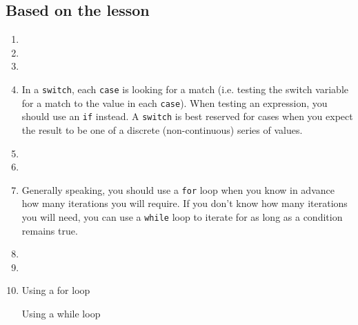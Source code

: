 \documentclass{article}
\begin{document}
	\subsection*{Based on the lesson}
	\begin{enumerate}
		\item 
		
		\item 
		
		\item 
		
		\item In a \texttt{switch}, each \texttt{case} is looking for a match (i.e. testing the switch variable for a match to the value in each \texttt{case}). When testing an expression, you should use an \texttt{if} instead. A \texttt{switch} is best reserved for cases when you expect the result to be one of a discrete (non-continuous) series of values.
		
		\item 
		
		\item 
		
		\item Generally speaking, you should use a \texttt{for} loop when you know in advance how many iterations you will require. If you don't know how many iterations you will need, you can use a \texttt{while} loop to iterate for as long as a condition remains true.
		
		\item 	
		
		\item 	
		
		\item Using a for loop
		
		
		Using a while loop
		
	\end{enumerate}
	
\end{document}
